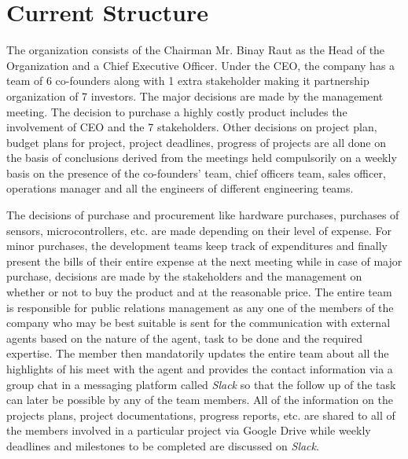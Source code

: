 \documentclass[12pt,a4paper]{scrreprt}
\begin{document}
\section{Current Structure}
    The organization consists of the Chairman Mr. Binay Raut as the Head of the Organization and a Chief Executive Officer. Under the CEO, the company has a team of 6 co-founders along with 1 extra stakeholder making it partnership organization of 7 investors. The major decisions are made by the management meeting. The decision to purchase a highly costly product includes the involvement of CEO and the 7 stakeholders. Other decisions on project plan, budget plans for project, project deadlines, progress of projects are all done on the basis of conclusions derived from the meetings held compulsorily on a weekly basis on the presence of the co-founders' team, chief officers team, sales officer, operations manager and all the engineers of different engineering teams.

    The decisions of purchase and procurement like hardware purchases, purchases of sensors, microcontrollers, etc. are made depending on their level of expense. For minor purchases, the development teams keep track of expenditures and finally present the bills of their entire expense at the next meeting while in case of major purchase, decisions are made by the stakeholders and the management on whether or not to buy the product and at the reasonable price. The entire team is responsible for public relations management as any one of the members of the company who may be best suitable is sent for the communication with external agents based on the nature of the agent, task to be done and the required expertise. The member then mandatorily updates the entire team about all the highlights of his meet with the agent and provides the contact information via a group chat in a messaging platform called \textit{Slack} so that the follow up of the task can later be possible by any of the team members. All of the information on the projects plans, project documentations, progress reports, etc. are shared to all of the members involved in a particular project via Google Drive while weekly deadlines and milestones to be completed are discussed on \textit{Slack}.
\end{document}

